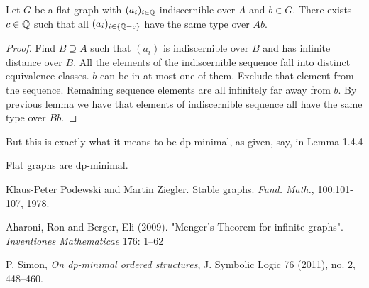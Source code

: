 \documentclass{amsart}
\begin{document}
\begin{Theorem}
	Let $G$ be a flat graph with $(a_i)_{i\in\mathbb{Q}}$ indiscernible over $A$ and $b \in G$. There exists $c \in \mathbb{Q}$ such that all $(a_i)_{i\in\{\mathbb{Q} - c\}}$ have the same type over $Ab$.
\end{Theorem}

\begin{proof}
	Find $B \supseteq A$ such that $(a_i)$ is indiscernible over $B$ and has infinite distance over $B$. All the elements of the indiscernible sequence fall into distinct equivalence classes. $b$ can be in at most one of them. Exclude that element from the sequence. Remaining sequence elements are all infinitely far away from $b$. By previous lemma we have that elements of indiscernible sequence all have the same type over $Bb$.
\end{proof}

But this is exactly what it means to be dp-minimal, as given, say, in \cite{simon_dp_minimal} Lemma 1.4.4

\begin{Corollary}
	Flat graphs are dp-minimal.
\end{Corollary}


\begin{thebibliography}{9}

	Klaus-Peter Podewski and Martin Ziegler. Stable graphs. \textit{Fund. Math.}, 100:101-107, 1978.

	Aharoni, Ron and Berger, Eli (2009). "Menger's Theorem for infinite graphs". \textit{Inventiones Mathematicae} 176: 1–62
	
	P. Simon, \textit{On dp-minimal ordered structures}, J. Symbolic Logic 76 (2011), no. 2, 448–460.


\end{thebibliography}
\end{document}

